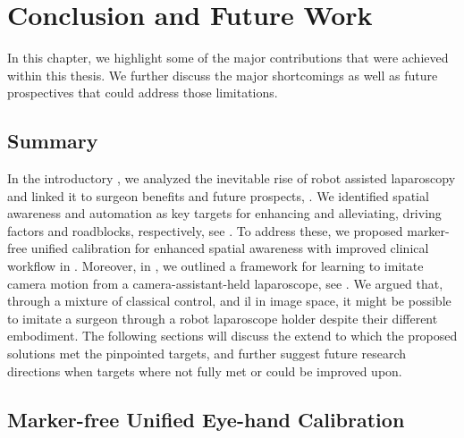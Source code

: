 \chapter[Conclusions and Future Work]{Conclusion and Future Work}
\label{chap:conclusion}
\minitoc

\newpage

In this chapter, we highlight some of the major contributions that were achieved within this thesis. We further discuss the major shortcomings as well as future prospectives that could address those limitations. 

\section{Summary}
In the introductory , we analyzed the inevitable rise of robot assisted laparoscopy and linked it to surgeon benefits and future prospects, . We identified spatial awareness and automation as key targets for enhancing and alleviating, driving factors and roadblocks, respectively, see . To address these, we proposed marker-free unified calibration for enhanced spatial awareness with improved clinical workflow in . Moreover, in , we outlined a framework for learning to imitate camera motion from a camera-assistant-held laparoscope, see . We argued that, through a mixture of classical control, and \gls{il} in image space, it might be possible to imitate a surgeon through a robot laparoscope holder despite their different embodiment. The following sections will discuss the extend to which the proposed solutions met the pinpointed targets, and further suggest future research directions when targets where not fully met or could be improved upon.

\section{Marker-free Unified Eye-hand Calibration}
\label{con:sec:marker_free}
